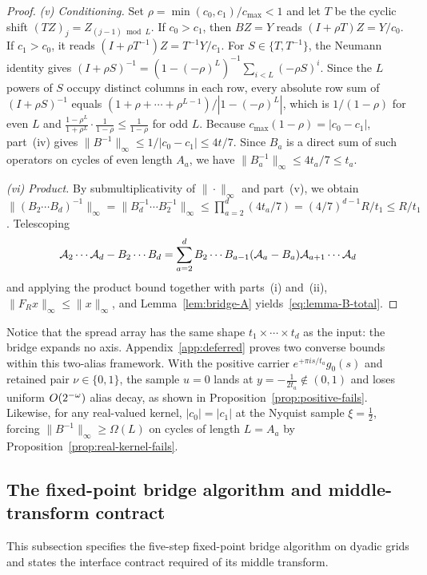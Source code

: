 \begin{proof}
\emph{(v) Conditioning.} Set $\rho=\min(c_0,c_1)/c_{\max}<1$ and let $T$ be the cyclic shift $(TZ)_j=Z_{(j-1)\bmod L}$.
If $c_0>c_1$, then $BZ=Y$ reads $(I+\rho T)Z=Y/c_0$. If $c_1>c_0$, it reads $(I+\rho T^{-1})Z=T^{-1}Y/c_1$. For
$S\in\{T,T^{-1}\}$, the Neumann identity gives $(I+\rho S)^{-1}=(1-(-\rho)^L)^{-1}\sum_{i<L}(-\rho S)^i$. Since the $L$
powers of $S$ occupy distinct columns in each row, every absolute row sum of $(I+\rho S)^{-1}$ equals
$(1+\rho+\cdots+\rho^{L-1})/|1-(-\rho)^L|$, which is $1/(1-\rho)$ for even $L$ and
$\frac{1-\rho^L}{1+\rho^L}\cdot\frac{1}{1-\rho}\le\frac{1}{1-\rho}$ for odd $L$. Because $c_{\max}(1-\rho)=|c_0-c_1|$,
part~(iv) gives $\|B^{-1}\|_\infty\le 1/|c_0-c_1|\le 4t/7$. Since $B_a$ is a direct sum of such operators on cycles of
even length $A_a$, we have $\|B_a^{-1}\|_\infty\le 4t_a/7\le t_a$.

\emph{(vi) Product.} By submultiplicativity of $\|\cdot\|_\infty$ and part~(v), we obtain
$\|(B_2\cdots B_d)^{-1}\|_\infty=\allowbreak\|B_d^{-1}\cdots B_2^{-1}\|_\infty\le\allowbreak\prod_{a=2}^d(4t_a/7)=\allowbreak(4/7)^{d-1}R/t_1\le\allowbreak R/t_1$.
Telescoping
\[
  \mathcal{A}_2\cdots\mathcal{A}_d-B_2\cdots B_d=\sum_{a=2}^d B_2\cdots B_{a-1}(\mathcal{A}_a-B_a)\mathcal{A}_{a+1}\cdots\mathcal{A}_d
\]
and applying the product bound together with parts~(i) and~(ii), $\|F_R x\|_\infty\le\|x\|_\infty$, and
Lemma~\ref{lem:bridge-A} yields~\eqref{eq:lemma-B-total}.
\end{proof}

Notice that the spread array has the same shape $t_1\times\cdots\times t_d$ as the input: the bridge expands no axis.
Appendix~\ref{app:deferred} proves two converse bounds within this two-alias framework. With the positive carrier $e^{+\pi i s/t_a}g_0(s)$ and retained pair
$\nu\in\{0,1\}$, the sample $u=0$ lands at $y=-\frac{1}{2t_a}\notin(0,1)$ and loses uniform $O(2^{-\omega})$ alias decay,
as shown in Proposition~\ref{prop:positive-fails}. Likewise, for any real-valued kernel, $|c_0|=|c_1|$ at the Nyquist
sample $\xi=\tfrac12$, forcing $\|B^{-1}\|_\infty\ge\Omega(L)$ on cycles of length $L=A_a$ by
Proposition~\ref{prop:real-kernel-fails}.

\subsection{The fixed-point bridge algorithm and middle-transform contract}\label{sec:bridge-alg}

This subsection specifies the five-step fixed-point bridge algorithm on dyadic grids and states the interface contract
required of its middle transform.

